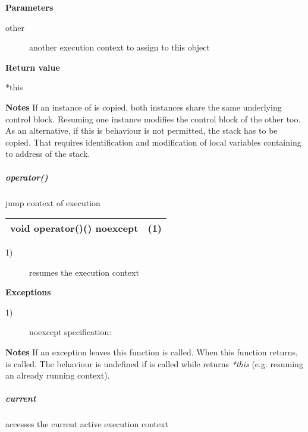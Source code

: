 {\bfseries Parameters}
\begin{description}
    \item[other]   another execution context to assign to this object\\
\end{description}

{\bfseries Return value}
\begin{description}
    \item[*this]
\end{description}

{\bfseries Notes}
\newline
If an instance of \ectx is copied, both instances share the same underlying
control block. Resuming one instance modifies the control block of the other
\ectx too.\\
As an alternative, if this is behaviour is not permitted, the stack has to be
copied. That requires identification and modification of local variables
containing to address of the stack.

\subparagraph*{operator()}
jump context of execution\\

\begin{tabular}{ l l }
    \midrule

    void operator()() noexcept & (1)\\

    \midrule
\end{tabular}

\begin{description}
    \item[1)] resumes the execution context\\
\end{description}

{\bfseries Exceptions}
\begin{description}
    \item[1)] noexcept specification: \\
\end{description}

{\bfseries Notes}
\newline
If an exception leaves this function  is called. When this
function returns,  is called. The behaviour is undefined if
 is called while  returns \emph{*this} (e.g.
resuming an already running context).

\subparagraph*{current}
accesses the current active execution context\\

